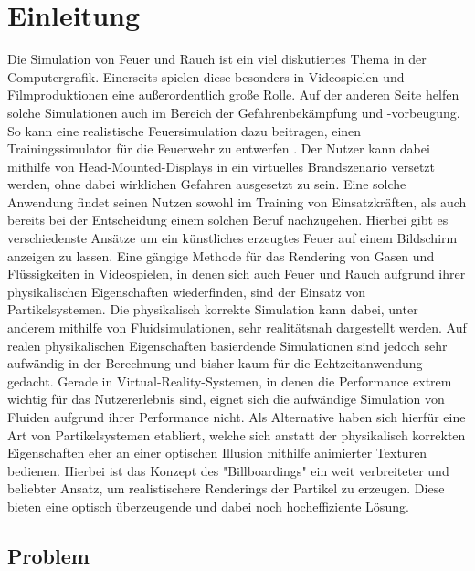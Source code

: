 \section{Einleitung}
\noindent

Die Simulation von Feuer und Rauch ist ein viel diskutiertes Thema in der Computergrafik. Einerseits
spielen diese besonders in Videospielen und Filmproduktionen eine außerordentlich große Rolle. Auf der
anderen Seite helfen solche Simulationen auch im Bereich der Gefahrenbekämpfung und -vorbeugung. 
So kann eine realistische Feuersimulation dazu beitragen, einen Trainingssimulator für die Feuerwehr zu
entwerfen \parencite{schlager}. Der Nutzer kann dabei mithilfe von Head-Mounted-Displays in ein virtuelles Brandszenario versetzt werden,
ohne dabei wirklichen Gefahren ausgesetzt zu sein. Eine solche Anwendung findet seinen Nutzen sowohl im Training
von Einsatzkräften, als auch bereits bei der Entscheidung einem solchen Beruf nachzugehen.
Hierbei gibt es verschiedenste Ansätze um ein künstliches erzeugtes Feuer auf einem
Bildschirm anzeigen zu lassen. Eine gängige Methode für das Rendering von Gasen und Flüssigkeiten
in Videospielen, in denen sich auch Feuer und Rauch aufgrund ihrer physikalischen Eigenschaften
wiederfinden, sind der Einsatz von Partikelsystemen. Die physikalisch korrekte Simulation kann dabei,
unter anderem mithilfe von Fluidsimulationen, sehr realitätsnah dargestellt werden.
Auf realen physikalischen Eigenschaften basierdende Simulationen sind jedoch sehr aufwändig in der
Berechnung und bisher kaum für die Echtzeitanwendung gedacht.
Gerade in Virtual-Reality-Systemen, in denen die Performance extrem wichtig für das Nutzererlebnis sind,
eignet sich die aufwändige Simulation von Fluiden aufgrund ihrer Performance nicht. Als Alternative haben
sich hierfür eine Art von Partikelsystemen etabliert, welche sich anstatt der physikalisch korrekten
Eigenschaften eher an einer optischen Illusion mithilfe animierter Texturen bedienen.
Hierbei ist das Konzept des "Billboardings" ein weit verbreiteter und beliebter Ansatz,
um realistischere Renderings der Partikel zu erzeugen. Diese bieten eine optisch überzeugende und
dabei noch hocheffiziente Lösung.



\subsection{Problem}


